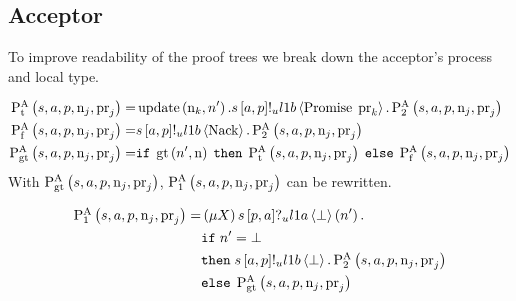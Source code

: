 \subsection{Acceptor}
To improve readability of the proof trees we break down the acceptor's process and local type.

\begin{align*}
\textstyle\operatorname{P^{A}_{t}}\left(
    s,
    a,
    p,
    \operatorname{n}_{j},
    \operatorname{pr}_{j}
\right) =
& \operatorname{update} \left(\operatorname{n}_{k}, n'\right).s\left[a, p\right]!_u l1b \left\langle \operatorname{Promise}\; \operatorname{pr}_{k} \right\rangle.\textstyle\operatorname{P^{A}_{2}}\left(
    s,
    a,
    p,
    \operatorname{n}_{j},
    \operatorname{pr}_{j}
\right)
\\
\textstyle\operatorname{P^{A}_{f}}\left(
    s,
    a,
    p,
    \operatorname{n}_{j},
    \operatorname{pr}_{j}
\right) =
&
    s\left[a, p\right]!_u l1b \left\langle \operatorname{Nack} \right\rangle.
    \textstyle\operatorname{P^{A}_{2}}\left(
        s,
        a,
        p,
        \operatorname{n}_{j},
        \operatorname{pr}_{j}
    \right)
    \\
\textstyle\operatorname{P^{A}_{gt}}\left(
    s,
    a,
    p,
    \operatorname{n}_{j},
    \operatorname{pr}_{j}
\right) =
&
    \mathtt{if}\; \operatorname{gt}\left(n', \operatorname{n}\right)
    \;\mathtt{then}\; \textstyle\operatorname{P^{A}_{t}}\left(
        s,
        a,
        p,
        \operatorname{n}_{j},
        \operatorname{pr}_{j}
    \right)
    \;\mathtt{else}\; \textstyle\operatorname{P^{A}_{f}}\left(
        s,
        a,
        p,
        \operatorname{n}_{j},
        \operatorname{pr}_{j}
    \right)
\end{align*}
With $\textstyle\operatorname{P^{A}_{gt}}\left(
    s,
    a,
    p,
    \operatorname{n}_{j},
    \operatorname{pr}_{j}
\right)$, $\textstyle\operatorname{P^{A}_{1}}\left(
    s,
    a,
    p,
    \operatorname{n}_{j},
    \operatorname{pr}_{j}
\right)$ can be rewritten.

\begin{align*}
\textstyle\operatorname{P^{A}_{1}}\left(
s,
a,
p,
\operatorname{n}_{j},
\operatorname{pr}_{j}
\right) =
&
    \left(\mu X\right)
    s\left[p, a\right]?_u l1a \left\langle \bot \right\rangle \left(n'\right).\\
&
    \mathtt{if}\; n'=\bot\\
&
    \mathtt{then}\;
        s\left[a, p\right]!_u l1b \left\langle \bot \right\rangle.
        \textstyle\operatorname{P^{A}_{2}}\left(
            s,
            a,
            p,
            \operatorname{n}_{j},
            \operatorname{pr}_{j}
        \right)\\
&
    \mathtt{else}\;
        \textstyle\operatorname{P^{A}_{gt}}\left(
            s,
            a,
            p,
            \operatorname{n}_{j},
            \operatorname{pr}_{j}
        \right)
\end{align*}

